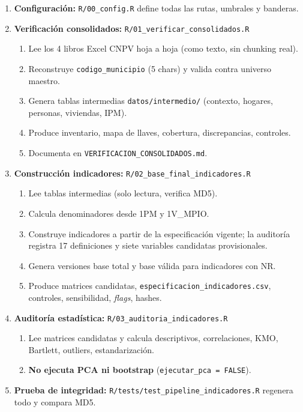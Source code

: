 \begin{enumerate}
    \item \textbf{Configuración:} \texttt{R/00\_config.R} define todas las rutas, umbrales y banderas.
    \item \textbf{Verificación consolidados:} \texttt{R/01\_verificar\_consolidados.R}
    \begin{enumerate}
        \item Lee los 4 libros Excel CNPV hoja a hoja (como texto, sin chunking real).
        \item Reconstruye \texttt{codigo\_municipio} (5 chars) y valida contra universo maestro.
        \item Genera tablas intermedias \texttt{datos/intermedio/} (contexto, hogares, personas, viviendas, IPM).
        \item Produce inventario, mapa de llaves, cobertura, discrepancias, controles.
        \item Documenta en \texttt{VERIFICACION\_CONSOLIDADOS.md}.
    \end{enumerate}
    \item \textbf{Construcción indicadores:} \texttt{R/02\_base\_final\_indicadores.R}
    \begin{enumerate}
        \item Lee tablas intermedias (solo lectura, verifica MD5).
        \item Calcula denominadores desde 1PM y 1V\_MPIO.
        \item Construye indicadores a partir de la especificación vigente; la auditoría registra 17 definiciones y siete variables candidatas provisionales.
        \item Genera versiones base total y base válida para indicadores con NR.
        \item Produce matrices candidatas, \texttt{especificacion\_indicadores.csv}, controles, sensibilidad, \textit{flags}, hashes.
    \end{enumerate}
    \item \textbf{Auditoría estadística:} \texttt{R/03\_auditoria\_indicadores.R}
    \begin{enumerate}
        \item Lee matrices candidatas y calcula descriptivos, correlaciones, KMO, Bartlett, outliers, estandarización.
        \item \textbf{No ejecuta PCA ni bootstrap} (\texttt{ejecutar\_pca = FALSE}).
    \end{enumerate}
    \item \textbf{Prueba de integridad:} \texttt{R/tests/test\_pipeline\_indicadores.R} regenera todo y compara MD5.
\end{enumerate}


